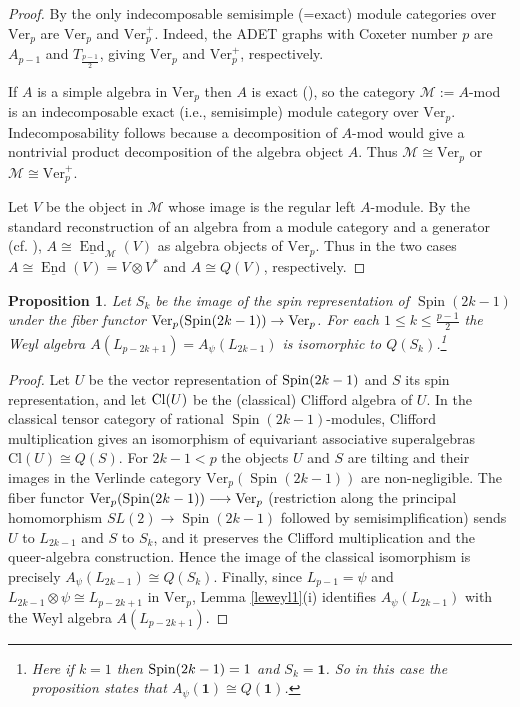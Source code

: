 \documentclass[12pt]{amsart}
\numberwithin{equation}{section}
\providecommand{\M}{}\renewcommand{\M}{\mathcal{M}}
\providecommand{\Ver}{}\renewcommand{\Ver}{\mathrm{Ver}}
\providecommand{\Cl}{}\renewcommand{\Cl}{\mathrm{Cl}}
\providecommand{\End}{}\renewcommand{\End}{\operatorname{End}}
\theoremstyle{plain}
\newtheorem{proposition}[theorem]{Proposition}
\theoremstyle{definition}
\theoremstyle{remark}
\begin{document}
\begin{proof} By \cite{EO,Os} the only indecomposable semisimple (=exact) module categories over $\Ver_p$ are $\Ver_p$ and $\Ver_p^+$.
Indeed, the ADET graphs with Coxeter number $p$ are $A_{p-1}$ and $T_{\frac{p-1}{2}}$, giving $\Ver_p$ and $\Ver_p^+$, respectively.

If $A$ is a simple algebra in $\Ver_p$ then $A$ is exact (\cite{CSZ}), so the category ${\mathcal M}:=A$-mod is an indecomposable exact (i.e., semisimple) module category over $\Ver_p$. Indecomposability follows because a decomposition of $A$-$\mathrm{mod}$ would give a nontrivial product decomposition of the algebra object $A$. Thus $\M\cong \Ver_p$ or $\M\cong \Ver_p^+$. 

Let $V$ be the object in $\M$ whose image is the regular left $A$-module. By the standard reconstruction of an algebra from a module category and a generator (cf. \cite[Subsection~7.10]{EGNO}),
$A\cong \underline{\End}_{\M}(V)$
as algebra objects of $\Ver_p$. Thus in the two cases $A\cong\underline{\End}(V)=V\otimes V^*$ and $A\cong Q(V)$, respectively.
\end{proof} 

\begin{proposition} Let $S_k$ be the image of the spin representation of $\operatorname{Spin}(2k-1)$ under the fiber functor $\Ver_p({\rm Spin}(2k-1))\to \Ver_p$.
 For each $1\le k\le \frac{p-1}{2}$ the Weyl algebra $A(L_{p-2k+1})=A_\psi(L_{2k-1})$ is isomorphic to $Q(S_k)$.\footnote{Here if $k=1$ then ${\rm Spin}(2k-1)=1$ and $S_k=\mathbf 1$. So in this case the proposition states that $A_\psi(\mathbf 1)\cong Q(\mathbf 1)$.}
\end{proposition} 

\begin{proof} 
 Let $U$ be the vector representation of ${\rm Spin}(2k-1)$ and $S$ its spin representation, and let ${\rm Cl}(U)$ be the (classical) Clifford algebra of $U$. In the classical tensor category of rational $\operatorname{Spin}(2k-1)$-modules, Clifford multiplication gives an isomorphism of equivariant associative superalgebras
$
\Cl(U)\cong Q(S).
$
For $2k-1<p$ the objects $U$ and $S$ are tilting and their images in the Verlinde category $\Ver_p(\operatorname{Spin}(2k-1))$ are non-negligible.
The fiber functor
$\Ver_p({\rm Spin}(2k-1))\longrightarrow \Ver_p$ (restriction along the principal homomorphism $SL(2)\to\operatorname{Spin}(2k-1)$ followed by semisimplification) sends $U$ to $L_{2k-1}$
 and $S$ to $S_k$, and it preserves the Clifford multiplication and the queer-algebra construction. Hence the image of the classical isomorphism is precisely $A_\psi(L_{2k-1})\cong Q(S_k)$.
Finally, since $L_{p-1}=\psi$ and $L_{2k-1}\otimes\psi\cong L_{p-2k+1}$ in $\Ver_p$, Lemma \ref{leweyl1}(i) identifies $A_\psi(L_{2k-1})$ with the Weyl algebra $A(L_{p-2k+1})$.
\end{proof} 
\end{document}
